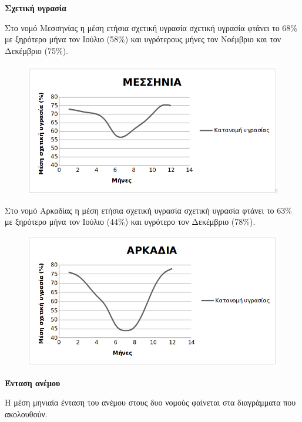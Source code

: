 \documentclass[12pt]{article}
\begin{document}
	\textbf{Σχετική υγρασία}
	
	Στο νομό Μεσσηνίας η μέση ετήσια σχετική υγρασία σχετική υγρασία φτάνει το 68\% με ξηρότερο μήνα τον Ιούλιο (58\%) και υγρότερους μήνες τον Νοέμβριο και τον Δεκέμβριο (75\%).
	
	\begin{figure} [H]
		\begin{center}
			\includegraphics [scale = 0.80] {messinia6.png}
		\end{center}
	\end{figure}

	Στο νομό Αρκαδίας η μέση ετήσια σχετική υγρασία σχετική υγρασία φτάνει το 63\% με ξηρότερο μήνα τον Ιούλιο (44\%) και υγρότερο τον Δεκέμβριο (78\%).
	
		\begin{figure} [H]
		\begin{center}
			\includegraphics [scale = 0.80] {arkadia6.png}
		\end{center}
	\end{figure}

	\textbf{Ένταση ανέμου}
	
	Η μέση μηνιαία ένταση του ανέμου στους δυο νομούς φαίνεται στα διαγράμματα που ακολουθούν.
	
\end{document}
